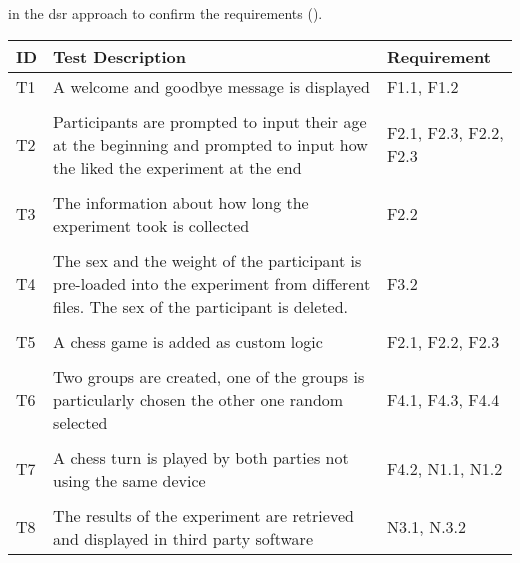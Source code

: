 in the \ac{dsr} approach to confirm the requirements (\cite{Sommerville.2011}).

\begin{table}[htbp]
    \centering
    \small
    \begin{tabular}{L{0.04\textwidth}L{0.7\textwidth}L{0.15\textwidth}}
    \hline
    ID  & Test Description                                                                                                                                     & Requirement                  \\ \hline
    T1  & A welcome and goodbye message is displayed                                                                                               & F1.1, F1.2                 \\
    & \\
    T2  & Participants are prompted to input their age at the beginning and prompted to input how the liked the experiment at the end              & F2.1, F2.3, F2.2, F2.3 \\
    & \\
    T3  & The information about how long the experiment took is collected                                                                          & F2.2                         \\
    & \\
    T4  & The sex and the weight of the participant is pre-loaded into the experiment from different files. The sex of the participant is deleted. & F3.2                         \\
    & \\
    T5  & A chess game is added as custom logic                                                                                                    & F2.1, F2.2, F2.3         \\
    & \\
    T6  & Two groups are created, one of the groups is particularly chosen the other one random selected                                           & F4.1, F4.3, F4.4         \\
    & \\
    T7  & A chess turn is played by both parties not using the same device                                                                         & F4.2, N1.1, N1.2         \\
    & \\
    T8  & The results of the experiment are retrieved and displayed in third party software                                                        & N3.1, N.3.2                \\

\end{tabular}
\end{table}
